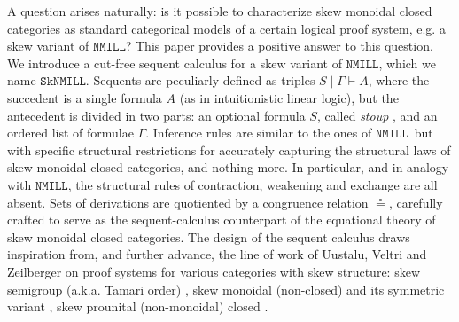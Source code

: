 \documentclass[copyright,creativecommons]{eptcs}
\theoremstyle{definition}
\newcommand{\NMILL}{$\mathtt{NMILL}$}
\newcommand{\SkNMILL}{$\mathtt{SkNMILL}$}
\begin{document}
A question arises naturally: is it possible to characterize skew monoidal closed categories as standard categorical models of a certain logical proof system, e.g. a skew variant of \NMILL?
This paper provides a positive answer to this question. We introduce a cut-free sequent calculus for a skew variant of \NMILL, which we name \SkNMILL. Sequents are peculiarly defined as triples $S \mid \Gamma \vdash A$, where the succedent is a single formula $A$ (as in intuitionistic linear logic), but the antecedent is divided in two parts: an optional formula $S$, called \emph{stoup} \cite{girard:constructive:91}, and an ordered list of formulae $\Gamma$. Inference rules are similar to the ones of \NMILL\ but with specific structural restrictions for accurately capturing the structural laws of skew monoidal closed categories, and nothing more. In particular, and in analogy with \NMILL, the structural rules of contraction, weakening and exchange are all absent. Sets of derivations are quotiented by a congruence relation $\circeq$, carefully crafted to serve as the sequent-calculus counterpart of the equational theory of skew monoidal closed categories. The design of the sequent calculus draws inspiration from, and further advance, the line of work of Uustalu, Veltri and Zeilberger on proof systems for various categories with skew structure: skew semigroup (a.k.a. Tamari order) \cite{zeilberger:semiassociative:19}, skew monoidal (non-closed) \cite{uustalu:sequent:2021,uustalu:proof:nodate} and its symmetric variant \cite{veltri:coherence:2021}, skew prounital (non-monoidal) closed \cite{uustalu:deductive:nodate}.
\end{document}
